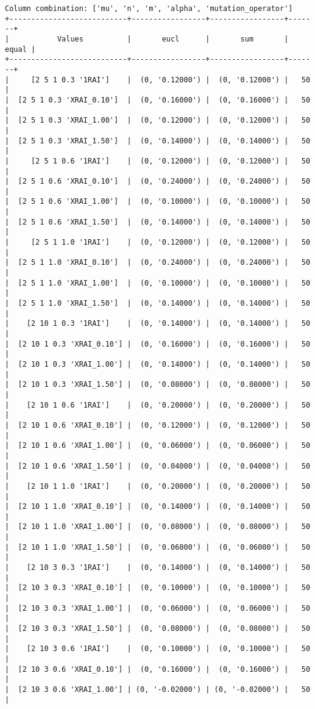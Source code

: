 \documentclass{article}
\begin{document}
\begin{verbatim}
Column combination: ['mu', 'n', 'm', 'alpha', 'mutation_operator']
+---------------------------+-----------------+-----------------+-------+
|           Values          |       eucl      |       sum       | equal |
+---------------------------+-----------------+-----------------+-------+
|     [2 5 1 0.3 '1RAI']    |  (0, '0.12000') |  (0, '0.12000') |   50  |
|  [2 5 1 0.3 'XRAI_0.10']  |  (0, '0.16000') |  (0, '0.16000') |   50  |
|  [2 5 1 0.3 'XRAI_1.00']  |  (0, '0.12000') |  (0, '0.12000') |   50  |
|  [2 5 1 0.3 'XRAI_1.50']  |  (0, '0.14000') |  (0, '0.14000') |   50  |
|     [2 5 1 0.6 '1RAI']    |  (0, '0.12000') |  (0, '0.12000') |   50  |
|  [2 5 1 0.6 'XRAI_0.10']  |  (0, '0.24000') |  (0, '0.24000') |   50  |
|  [2 5 1 0.6 'XRAI_1.00']  |  (0, '0.10000') |  (0, '0.10000') |   50  |
|  [2 5 1 0.6 'XRAI_1.50']  |  (0, '0.14000') |  (0, '0.14000') |   50  |
|     [2 5 1 1.0 '1RAI']    |  (0, '0.12000') |  (0, '0.12000') |   50  |
|  [2 5 1 1.0 'XRAI_0.10']  |  (0, '0.24000') |  (0, '0.24000') |   50  |
|  [2 5 1 1.0 'XRAI_1.00']  |  (0, '0.10000') |  (0, '0.10000') |   50  |
|  [2 5 1 1.0 'XRAI_1.50']  |  (0, '0.14000') |  (0, '0.14000') |   50  |
|    [2 10 1 0.3 '1RAI']    |  (0, '0.14000') |  (0, '0.14000') |   50  |
|  [2 10 1 0.3 'XRAI_0.10'] |  (0, '0.16000') |  (0, '0.16000') |   50  |
|  [2 10 1 0.3 'XRAI_1.00'] |  (0, '0.14000') |  (0, '0.14000') |   50  |
|  [2 10 1 0.3 'XRAI_1.50'] |  (0, '0.08000') |  (0, '0.08000') |   50  |
|    [2 10 1 0.6 '1RAI']    |  (0, '0.20000') |  (0, '0.20000') |   50  |
|  [2 10 1 0.6 'XRAI_0.10'] |  (0, '0.12000') |  (0, '0.12000') |   50  |
|  [2 10 1 0.6 'XRAI_1.00'] |  (0, '0.06000') |  (0, '0.06000') |   50  |
|  [2 10 1 0.6 'XRAI_1.50'] |  (0, '0.04000') |  (0, '0.04000') |   50  |
|    [2 10 1 1.0 '1RAI']    |  (0, '0.20000') |  (0, '0.20000') |   50  |
|  [2 10 1 1.0 'XRAI_0.10'] |  (0, '0.14000') |  (0, '0.14000') |   50  |
|  [2 10 1 1.0 'XRAI_1.00'] |  (0, '0.08000') |  (0, '0.08000') |   50  |
|  [2 10 1 1.0 'XRAI_1.50'] |  (0, '0.06000') |  (0, '0.06000') |   50  |
|    [2 10 3 0.3 '1RAI']    |  (0, '0.14000') |  (0, '0.14000') |   50  |
|  [2 10 3 0.3 'XRAI_0.10'] |  (0, '0.10000') |  (0, '0.10000') |   50  |
|  [2 10 3 0.3 'XRAI_1.00'] |  (0, '0.06000') |  (0, '0.06000') |   50  |
|  [2 10 3 0.3 'XRAI_1.50'] |  (0, '0.08000') |  (0, '0.08000') |   50  |
|    [2 10 3 0.6 '1RAI']    |  (0, '0.10000') |  (0, '0.10000') |   50  |
|  [2 10 3 0.6 'XRAI_0.10'] |  (0, '0.16000') |  (0, '0.16000') |   50  |
|  [2 10 3 0.6 'XRAI_1.00'] | (0, '-0.02000') | (0, '-0.02000') |   50  |

\end{verbatim}
\end{document}
